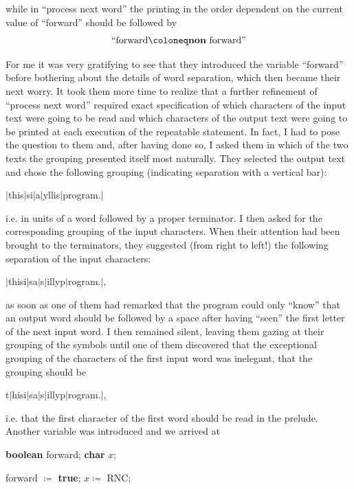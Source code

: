 \documentclass[twoside,11pt]{book}
\begin{document}
\noindent
while in ``process next word'' the printing in the order dependent on the current value of ``forward'' should be followed by
$$
\text{``forward} \coloneq \text{\textbf{non} forward''}
$$

For me it was very gratifying to see that they introduced the variable ``forward'' before bothering about the details of word separation, which then became their next worry. It took them more time to realize that a further refinement of ``process next word'' required exact specification of which characters of the input text were going to be read and which characters of the output text were going to be printed at each execution of the repeatable statement. In fact, I had to pose the question to them and, after having done so, I asked them in which of the two texts the grouping presented itself most naturally. They selected the output text and chose the following grouping (indicating separation with a vertical bar):

\quad $\mid$this\textendash $\mid$si\textendash $\mid$a\textendash $\mid$yllis\textendash $\mid$program.$\mid$

\noindent
i.e. in units of a word followed by a proper terminator. I then asked for the corresponding grouping of the input characters. When their attention had been brought to the terminators, they suggested (from right to left!) the following separation of the input characters:

\quad $\mid$this\textemdash{}i$\mid$s\textemdash{}a$\mid$\textemdash{}s$\mid$illy\textemdash{}p$\mid$rogram\textemdash{}.$\mid$,

\noindent
as soon as one of them had remarked that the program could only ``know'' that an output word should be followed by a space after having ``seen'' the first letter of the next input word. I then remained silent, leaving them gazing at their grouping of the symbols until one of them discovered that the exceptional grouping of the characters of the first input word was inelegant, that the grouping should be

\quad t$\mid$his\textemdash{}i$\mid$s\textemdash{}a$\mid$\textemdash{}s$\mid$illy\textemdash{}p$\mid$rogram\textemdash{}.$\mid$,

\noindent
i.e. that the first character of the first word should be read in the prelude. Another variable was introduced and we arrived at

\quad \textbf{boolean} forward; \textbf{char} $x$;

\quad forward $\coloneq$ \textbf{true}; $x \coloneq$ RNC;
\end{document}
